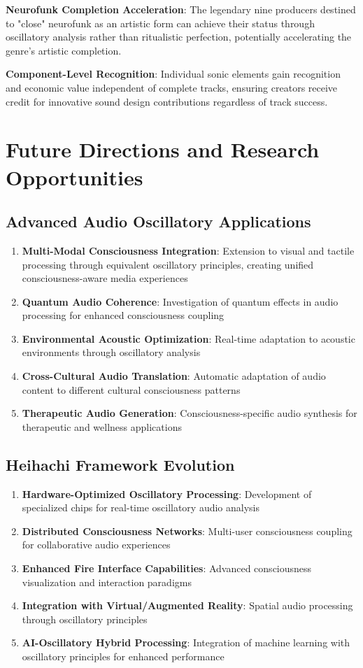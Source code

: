 \documentclass[12pt,a4paper]{article}
\begin{document}
\textbf{Neurofunk Completion Acceleration}: The legendary nine producers destined to "close" neurofunk as an artistic form can achieve their status through oscillatory analysis rather than ritualistic perfection, potentially accelerating the genre's artistic completion.

\textbf{Component-Level Recognition}: Individual sonic elements gain recognition and economic value independent of complete tracks, ensuring creators receive credit for innovative sound design contributions regardless of track success.

\section{Future Directions and Research Opportunities}

\subsection{Advanced Audio Oscillatory Applications}

\begin{enumerate}
\item \textbf{Multi-Modal Consciousness Integration}: Extension to visual and tactile processing through equivalent oscillatory principles, creating unified consciousness-aware media experiences
\item \textbf{Quantum Audio Coherence}: Investigation of quantum effects in audio processing for enhanced consciousness coupling
\item \textbf{Environmental Acoustic Optimization}: Real-time adaptation to acoustic environments through oscillatory analysis
\item \textbf{Cross-Cultural Audio Translation}: Automatic adaptation of audio content to different cultural consciousness patterns
\item \textbf{Therapeutic Audio Generation}: Consciousness-specific audio synthesis for therapeutic and wellness applications
\end{enumerate}

\subsection{Heihachi Framework Evolution}

\begin{enumerate}
\item \textbf{Hardware-Optimized Oscillatory Processing}: Development of specialized chips for real-time oscillatory audio analysis
\item \textbf{Distributed Consciousness Networks}: Multi-user consciousness coupling for collaborative audio experiences
\item \textbf{Enhanced Fire Interface Capabilities}: Advanced consciousness visualization and interaction paradigms
\item \textbf{Integration with Virtual/Augmented Reality}: Spatial audio processing through oscillatory principles
\item \textbf{AI-Oscillatory Hybrid Processing}: Integration of machine learning with oscillatory principles for enhanced performance
\end{enumerate}
\end{document}
